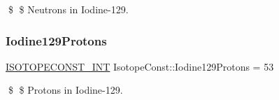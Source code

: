 \$ \$ Neutrons in Iodine-\/129. \mbox{\label{group___isotope_const-_iodine-_i129_gaa2cd5d3c1be6f17ebe525b6e3d7cfd75}} 
\subsubsection{\texorpdfstring{Iodine129\+Protons}{Iodine129Protons}}
{\footnotesize\ttfamily \mbox{\hyperlink{group___isotope_const-_macros_ga5f18360b3e99483a35c32d789e62621c}{I\+S\+O\+T\+O\+P\+E\+C\+O\+N\+S\+T\+\_\+\+I\+NT}} Isotope\+Const\+::\+Iodine129\+Protons = 53}

\$ \$ Protons in Iodine-\/129. 
